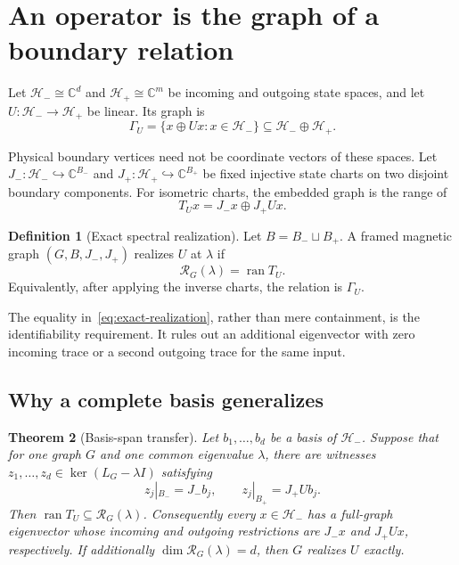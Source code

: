 \documentclass[11pt]{article}
\numberwithin{equation}{section}
\newtheorem{theorem}{Theorem}[section]
\theoremstyle{definition}
\newtheorem{definition}[theorem]{Definition}
\theoremstyle{remark}
\newcommand{\C}{\mathbb{C}}
\newcommand{\ran}{\operatorname{ran}}
\begin{document}
\section{An operator is the graph of a boundary relation}

Let $\mathcal H_-\cong\C^d$ and $\mathcal H_+\cong\C^m$ be incoming and
outgoing state spaces, and let $U:\mathcal H_-\to\mathcal H_+$ be linear.  Its
graph is
\begin{equation}
  \Gamma_U=\{x\oplus Ux:x\in\mathcal H_-\}
  \subseteq\mathcal H_-\oplus\mathcal H_+.
  \label{eq:graph-U}
\end{equation}

Physical boundary vertices need not be coordinate vectors of these spaces.
Let $J_-:\mathcal H_-\hookrightarrow\C^{B_-}$ and
$J_+:\mathcal H_+\hookrightarrow\C^{B_+}$ be fixed injective state charts on
two disjoint boundary components.  For isometric charts, the embedded graph is
the range of
\begin{equation}
  T_Ux=J_-x\oplus J_+Ux.
  \label{eq:embedded-graph}
\end{equation}

\begin{definition}[Exact spectral realization]
Let $B=B_-\sqcup B_+$.  A framed magnetic graph $(G,B,J_-,J_+)$ realizes $U$
at $\lambda$ if
\begin{equation}
  \mathcal R_G(\lambda)=\ran T_U.
  \label{eq:exact-realization}
\end{equation}
Equivalently, after applying the inverse charts, the relation is $\Gamma_U$.
\end{definition}

The equality in~\eqref{eq:exact-realization}, rather than mere containment, is
the identifiability requirement.  It rules out an additional eigenvector with
zero incoming trace or a second outgoing trace for the same input.

\subsection{Why a complete basis generalizes}

\begin{theorem}[Basis-span transfer]
\label{thm:basis-span}
Let $b_1,\ldots,b_d$ be a basis of $\mathcal H_-$.  Suppose that for one graph
$G$ and one common eigenvalue $\lambda$, there are witnesses
$z_1,\ldots,z_d\in\ker(L_G-\lambda I)$ satisfying
\begin{equation}
  z_j|_{B_-}=J_-b_j,
  \qquad
  z_j|_{B_+}=J_+Ub_j.
  \label{eq:witness-restrictions}
\end{equation}
Then $\ran T_U\subseteq\mathcal R_G(\lambda)$.  Consequently every
$x\in\mathcal H_-$ has a full-graph eigenvector whose incoming and outgoing
restrictions are $J_-x$ and $J_+Ux$, respectively.  If additionally
$\dim\mathcal R_G(\lambda)=d$, then $G$ realizes $U$ exactly.
\end{theorem}
\end{document}
